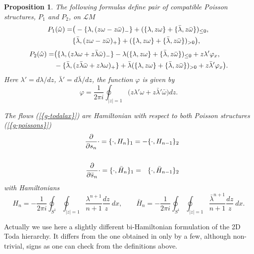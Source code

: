 \documentclass[numbook, envcountsame, envcountreset]{svjour3}
\newtheorem{prop}[theorem]{Proposition}
\begin{document}
\begin{prop} The following formulas define pair of compatible Poisson structures, $P_1$ and $P_2$, on ${{\mathcal L}} M$ 
\begin{eqnarray} \label{g-poissons}
P_1(\hat\omega) = 
&\big( -\{ {\lambda}, (z \omega - z \bar\omega)_- \} 
+( \{ {\lambda} , z \omega \} + \{ \bar{\lambda} , z \bar\omega \} )_{\leq0} , 
{\nonumber}\\
& \{ \bar{\lambda} , ( z \omega - z \bar\omega )_+ \} + ( \{ {\lambda} , z \omega \} + \{ \bar{\lambda} , z \bar\omega \} )_{>0} 
\big) ,
\end{eqnarray}
\begin{eqnarray}
P_2(\hat\omega) = 
& \big( \{ {\lambda} , ( z {\lambda}  \omega + z \bar{\lambda} \bar\omega )_- \} 
- {\lambda} ( \{ {\lambda} , z \omega \} + \{ \bar{\lambda} , z \bar\omega \} )_{\leq0}
+ z {\lambda}' \varphi_x , {\nonumber}\\
&-  \{ \bar{\lambda} , (z \bar{\lambda} \bar\omega + z {\lambda} \omega )_+ \}
+ \bar{\lambda} ( \{ {\lambda} , z \omega \} + \{ \bar{\lambda} , z \bar\omega \} )_{>0}
+ z \bar{\lambda}' \varphi_x \big).
\label{g-poissons1}
\end{eqnarray}
Here $\lambda'=d\lambda/dz$, $\bar\lambda'=d\bar\lambda/dz$, the function $\varphi$ is given by
\begin{equation}
\varphi = \frac1{2 \pi i} \oint_{|z|=1} \big( z{\lambda}' \omega + z \bar{\lambda}' \bar\omega \big) dz.
\end{equation}

The flows {(\ref{{g-todalax}})} are Hamiltonian with respect to both Poisson structures {(\ref{{g-poissons}})} 
\begin{eqnarray} \label{recurt} 
&&
\frac{\partial}{{\partial} s_n} \cdot = \{ \cdot , H_n \}_1 = -\{ \cdot , H_{n-1} \}_2 
{\nonumber}\\
&&
\\
&&
\frac{\partial}{{\partial} \bar{s}_n} \cdot = \{ \cdot , \bar{H}_n \}_1 =  ~~\{ \cdot , \bar{H}_{n-1} \}_2
{\nonumber}
\end{eqnarray}
with Hamiltonians
\begin{equation}\label{hamit}
H_n =  -\frac1{2 \pi i}\oint_{S^1} \oint_{|z|=1} \frac{{\lambda}^{n+1}}{n+1} \frac{dz}z \ dx,\qquad 
\bar{H}_n =  -\frac1{2 \pi i}\oint_{S^1} \oint_{|z|=1} \frac{\bar{\lambda}^{n+1}}{n+1} \frac{dz}z \ dx. 
\end{equation}
\end{prop}

\begin{remark} Actually we use here a slightly different bi-Hamiltonian formulation of the 2D Toda hierarchy. It differs from the one obtained in \cite{ca1} only by a few, although non-trivial, signs as one can check from the definitions above.
\end{remark}
\end{document}
